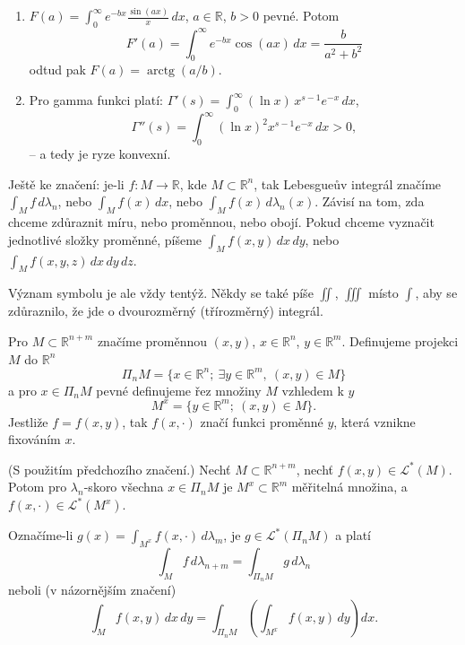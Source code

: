 \begin{priklad}
\begin{enumerate}[1.]
\item $F(a) = \int_0^{\infty} e^{-bx} \frac{\sin(ax)}{x} \, dx$,
$a \in \mathbb{R}$, $b > 0$ pevné. Potom
\[
F'(a) = \int_0^{\infty} e^{-bx} \cos(ax) \, dx
= \frac{b}{a^2 + b^2}
\]
odtud pak $F(a) = \operatorname{arctg}(a/b)$.

\item Pro gamma funkci platí:
$\Gamma'(s) = \int_0^\infty (\ln x)\, x^{s-1} e^{-x} \, dx$,
\[
\Gamma''(s) = \int_0^\infty (\ln x)^2 x^{s-1} e^{-x} \, dx > 0,
\]
-- a tedy je ryze konvexní.
\end{enumerate}
\end{priklad}

\begin{poznamka}
Ještě ke značení: je-li $f : M \to \mathbb{R}$, kde
$M \subset \mathbb{R}^n$, tak Lebesgueův integrál značíme
$\int_M f \, d\lambda_n$, nebo $\int_M f(x) \, dx$, nebo
$\int_M f(x) \, d\lambda_n(x)$. Závisí na tom, zda chceme zdůraznit
míru, nebo proměnnou, nebo obojí. Pokud chceme vyznačit jednotlivé
složky proměnné, píšeme $\int_M f(x, y) \, dx\, dy$, nebo
$\int_M f(x, y, z) \, dx\, dy\, dz$.

Význam symbolu je ale vždy tentýž. Někdy se také píše $\iint$,
$\iiint$ místo $\int$, aby se zdůraznilo, že jde o dvourozměrný
(třírozměrný) integrál.
\end{poznamka}

\begin{poznamka}
Pro $M \subset \mathbb{R}^{n+m}$ značíme proměnnou $(x, y)$,
$x \in \mathbb{R}^n$, $y \in \mathbb{R}^m$. Definujeme projekci $M$
do $\mathbb{R}^n$
\[
\Pi_n M = \{x \in \mathbb{R}^n; \ \exists y \in \mathbb{R}^m,
\ (x, y) \in M\}
\]
a pro $x \in \Pi_n M$ pevné definujeme řez množiny $M$ vzhledem k $y$
\[
M^x = \{y \in \mathbb{R}^m; \ (x, y) \in M\}.
\]
Jestliže $f = f(x, y)$, tak $f(x, \cdot)$ značí funkci proměnné $y$,
která vznikne fixováním $x$.
\end{poznamka}

\begin{veta}
(S použitím předchozího značení.) Nechť $M \subset \mathbb{R}^{n+m}$,
nechť $f(x, y) \in \mathcal{L}^*(M)$. Potom pro $\lambda_n$-skoro
všechna $x \in \Pi_n M$ je $M^x \subset \mathbb{R}^m$ měřitelná
množina, a $f(x, \cdot) \in \mathcal{L}^*(M^x)$.

Označíme-li $g(x) = \int_{M^x} f(x, \cdot) \, d\lambda_m$, je
$g \in \mathcal{L}^*(\Pi_n M)$ a platí
\[
\int_M f \, d\lambda_{n+m} = \int_{\Pi_n M} g \, d\lambda_n
\]
neboli (v názornějším značení)
\[
\int_M f(x, y) \, dx\, dy
= \int_{\Pi_n M} \left( \int_{M^x} f(x, y) \, dy \right) dx.
\]
\end{veta}


